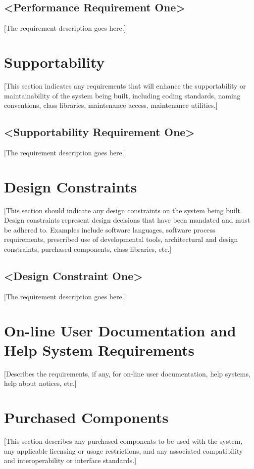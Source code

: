 \documentclass[a4paper,12pt,chapterprefix=false,bibliography=totoc,listof=totoc]{scrreprt}
\begin{document}
\subsection{<Performance Requirement One>}
[The requirement description goes here.]

\section{Supportability}
[This section indicates any requirements that will enhance the supportability or maintainability of the system being built, including coding standards, naming conventions, class libraries, maintenance access, maintenance utilities.]

\subsection{<Supportability Requirement One>}
[The requirement description goes here.]

\section{Design Constraints}
[This section should indicate any design constraints on the system being built. Design constraints represent design decisions that have been mandated and must be adhered to.  Examples include software languages, software process requirements, prescribed use of developmental tools, architectural and design constraints, purchased components, class libraries, etc.]

\subsection{<Design Constraint One>}
[The requirement description goes here.]

\section{On-line User Documentation and Help System Requirements}
[Describes the requirements, if any, for on-line user documentation, help systems, help about notices, etc.]

\section{Purchased Components}
[This section describes any purchased components to be used with the system, any applicable licensing or usage restrictions, and any associated compatibility and interoperability or interface standards.]
\end{document}
